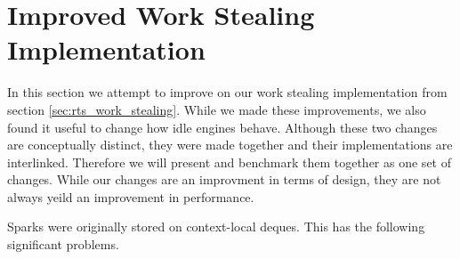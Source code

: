 
\section{Improved Work Stealing Implementation}
\label{sec:rts_work_stealing2}


In this section we attempt to improve on our work stealing
implementation from section \ref{sec:rts_work_stealing}.
While we made these improvements,
we also found it useful to change how idle engines behave.
Although these two changes are conceptually distinct,
they were made together and their implementations are interlinked.
Therefore we will present and benchmark them together as one set of changes.
While our changes are an improvment in terms of design,
they are not always yeild an improvement in performance.

Sparks were originally stored on context-local deques.
This has the following significant problems.

